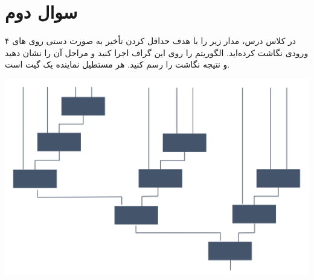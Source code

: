 \section{سوال دوم}




در کلاس درس، مدار زیر را با هدف حداقل کردن تأخیر به صورت دستی روی های ۴ ورودی نگاشت کرده‌اید. الگوریتم  را روی این گراف اجرا کنید و مراحل آن را نشان دهید و نتیجه نگاشت را رسم کنید. هر مستطیل نماینده یک گیت است.


\begin{center}
	\includegraphics*[width=0.7\linewidth]{pics/img1.png}
	\label{شکل سوال ۲}
\end{center}
